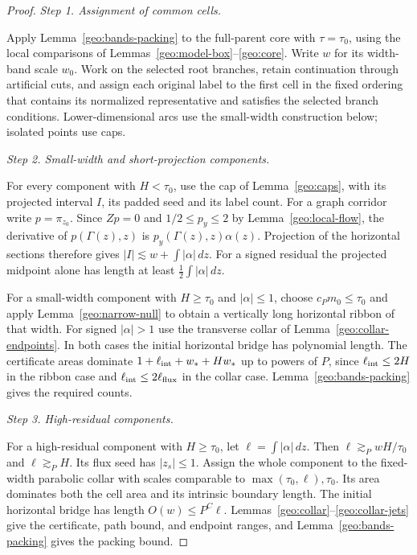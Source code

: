 \documentclass[11pt]{amsart}
\theoremstyle{definition}
\theoremstyle{remark}
\numberwithin{equation}{section}
\begin{document}
\begin{proof}
\par\medskip\noindent\textit{Step 1. Assignment of common cells.}\par\nobreak\smallskip
Apply Lemma~\ref{geo:bands-packing} to the full-parent core with \(\tau=\tau_0\), using the local comparisons of Lemmas~\ref{geo:model-box}--\ref{geo:core}. Write \(w\) for its width-band scale \(w_0\). Work on the selected root branches, retain continuation through artificial cuts, and assign each original label to the first cell in the fixed ordering that contains its normalized representative and satisfies the selected branch conditions. Lower-dimensional arcs use the small-width construction below; isolated points use caps.

\par\medskip\noindent\textit{Step 2. Small-width and short-projection components.}\par\nobreak\smallskip
For every component with $H<\tau_0$, use the cap of Lemma~\ref{geo:caps}, with its projected interval $I$, its padded seed and its label count. For a graph corridor write $p=\pi_{z_0}$. Since $Zp=0$ and $1/2\le p_y\le2$ by Lemma~\ref{geo:local-flow}, the derivative of $p(\Gamma(z),z)$ is $p_y(\Gamma(z),z)\alpha(z)$. Projection of the horizontal sections therefore gives $|I|\lesssim w+\int|\alpha|\,dz$. For a signed residual the projected midpoint alone has length at least $\tfrac12\int|\alpha|\,dz$.

For a small-width component with $H\ge\tau_0$ and $|\alpha|\le1$, choose $c_Pm_0\le\tau_0$ and apply Lemma~\ref{geo:narrow-null} to obtain a vertically long horizontal ribbon of that width. For signed $|\alpha|>1$ use the transverse collar of Lemma~\ref{geo:collar-endpoints}. In both cases the initial horizontal bridge has polynomial length. The certificate areas dominate $1+\ell_{\rm int}+w_*+Hw_*$ up to powers of $P$, since $\ell_{\rm int}\le2H$ in the ribbon case and $\ell_{\rm int}\le2\ell_{\rm flux}$ in the collar case. Lemma~\ref{geo:bands-packing} gives the required counts.

\par\medskip\noindent\textit{Step 3. High-residual components.}\par\nobreak\smallskip
For a high-residual component with $H\ge \tau_0$, let $\ell=\int|\alpha|\,dz$. Then $\ell\gtrsim_PwH/\tau_0$ and $\ell\gtrsim_PH$. Its flux seed has $|z_s|\le1$. Assign the whole component to the fixed-width parabolic collar with scales comparable to $\max(\tau_0,\ell),\tau_0$. Its area dominates both the cell area and its intrinsic boundary length. The initial horizontal bridge has length $O(w)\le P^C\ell$. Lemmas~\ref{geo:collar}--\ref{geo:collar-jets} give the certificate, path bound, and endpoint ranges, and Lemma~\ref{geo:bands-packing} gives the packing bound.


\end{proof}
\end{document}
